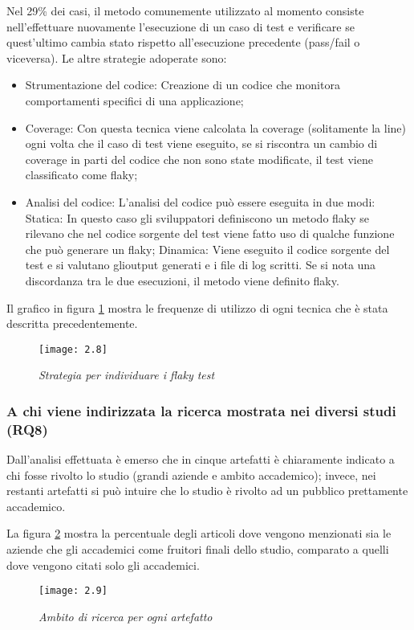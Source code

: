 Nel 29\% dei casi, il metodo comunemente utilizzato al momento consiste
nell’effettuare nuovamente l’esecuzione di un caso di test e verificare se quest’ultimo cambia stato rispetto all’esecuzione precedente (pass/fail o viceversa). Le altre strategie adoperate sono:
\begin{itemize}
	\item Strumentazione del codice: Creazione di un codice che monitora comportamenti specifici di una applicazione;
	\item Coverage: Con questa tecnica viene calcolata la coverage (solitamente la line) ogni volta che il caso di test viene eseguito, se si riscontra un cambio di coverage in parti del codice che non sono state modificate, il test viene classificato come flaky;
	\item Analisi del codice: L’analisi del codice può essere eseguita in due modi:
	\subitem Statica: In questo caso gli sviluppatori definiscono un metodo flaky se rilevano che nel codice sorgente del test viene fatto uso di qualche funzione che può generare un flaky;
	\subitem Dinamica: Viene eseguito il codice sorgente del test e si valutano glioutput generati e i file di log scritti. Se si nota una discordanza tra le due esecuzioni, il metodo viene definito flaky.
\end{itemize}

Il grafico in figura \ref{fig:fig.2.8} mostra le frequenze di utilizzo di ogni tecnica che è stata descritta precedentemente.
\newpage
\begin{figure}[h]
	\centering
	\texttt{[image: 2.8]}
	\caption{\emph{Strategia per individuare i flaky test}}
	\label{fig:fig.2.8}
\end{figure}
\subsubsection{A chi viene indirizzata la ricerca mostrata nei diversi studi (RQ8)}
Dall'analisi effettuata è emerso che in cinque artefatti è chiaramente indicato a chi fosse rivolto lo studio (grandi aziende e ambito accademico); invece, nei restanti artefatti si può intuire che lo studio è rivolto ad un pubblico prettamente accademico.

La figura \ref{fig:fig.2.9} mostra la percentuale degli articoli dove vengono menzionati sia le aziende che gli accademici come fruitori finali dello studio, comparato a quelli dove vengono citati solo gli accademici.\newpage
\begin{figure}[h]
	\centering
	\texttt{[image: 2.9]}
	\caption{\emph{Ambito di ricerca per ogni artefatto}}
	\label{fig:fig.2.9}
\end{figure}

